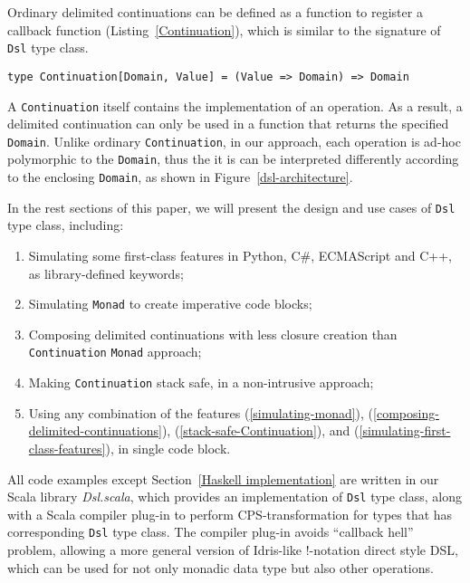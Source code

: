 Ordinary delimited continuations \cite{Danvy89afunctional} can be defined as a function to register a callback function (Listing~\ref{Continuation}), which is similar to the signature of \lstinline{Dsl} type class.

\begin{lstlisting}[caption={The definition of a delimited continuation},label={Continuation}]
type Continuation[Domain, Value] = (Value => Domain) => Domain
\end{lstlisting}

A \lstinline{Continuation} itself contains the implementation of an operation. As a result, a delimited continuation can only be used in a function that returns the specified \lstinline{Domain}. Unlike ordinary \lstinline{Continuation}, in our approach, each operation is ad-hoc polymorphic to the \lstinline{Domain}, thus the it is can be interpreted differently according to the enclosing \lstinline{Domain}, as shown in Figure~\ref{dsl-architecture}.

In the rest sections of this paper, we will present the design and use cases of \lstinline{Dsl} type class, including:

\begin{enumerate}
  \item Simulating some first-class features in Python, C\#, ECMAScript and C++, as library-defined keywords;
  \label{simulating-first-class-features}

  \item Simulating \lstinline{Monad} to create imperative code blocks;
  \label{simulating-monad}

  \item Composing delimited continuations with less closure creation than \lstinline{Continuation} \lstinline{Monad} approach;
  \label{composing-delimited-continuations}

  \item Making \lstinline{Continuation} stack safe, in a non-intrusive approach;
  \label{stack-safe-Continuation}

  \item Using any combination of the features (\ref{simulating-monad}), (\ref{composing-delimited-continuations}), (\ref{stack-safe-Continuation}), and (\ref{simulating-first-class-features}), in single code block.
\end{enumerate}

All code examples except Section~\ref{Haskell implementation} are written in our Scala library \textit{Dsl.scala}, which provides an implementation of \lstinline{Dsl} type class, along with a Scala compiler plug-in to perform CPS-transformation for types that has corresponding \lstinline{Dsl} type class. The compiler plug-in avoids ``callback hell'' problem, allowing a more general version of Idris-like !-notation \cite{brady2013idris} direct style DSL, which can be used for not only monadic data type but also other operations.

